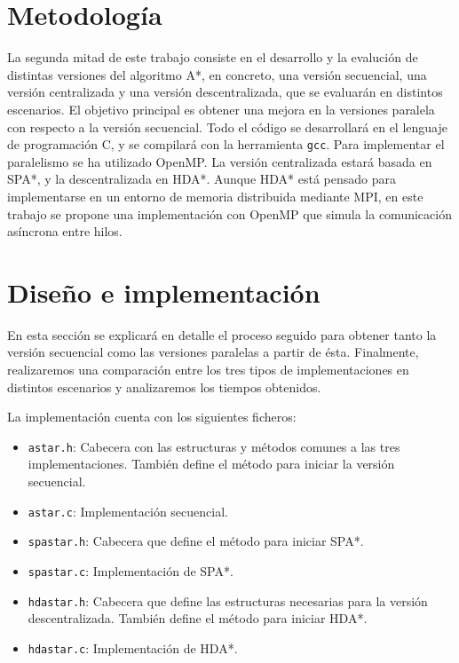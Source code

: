 \documentclass[a4paper,12pt]{article}
\begin{document}
\newpage

\section{Metodología} \label{sec:metodologia}

La segunda mitad de este trabajo consiste en el desarrollo y la evalución de distintas versiones del algoritmo A*, en concreto, una versión secuencial, una versión centralizada y una versión descentralizada, que se evaluarán en distintos escenarios. El objetivo principal es obtener una mejora en la versiones paralela con respecto a la versión secuencial. Todo el código se desarrollará en el lenguaje de programación C, y se compilará con la herramienta \verb|gcc|. Para implementar el paralelismo se ha utilizado OpenMP. La versión centralizada estará basada en SPA*, y la descentralizada en HDA*. Aunque HDA* está pensado para implementarse en un entorno de memoria distribuida mediante MPI, en este trabajo se propone una implementación con OpenMP que simula la comunicación asíncrona entre hilos.


\newpage

\section{Diseño e implementación} \label{sec:implementacion}

En esta sección se explicará en detalle el proceso seguido para obtener tanto la versión secuencial como las versiones paralelas a partir de ésta. Finalmente, realizaremos una comparación entre los tres tipos de implementaciones en distintos escenarios y analizaremos los tiempos obtenidos.

La implementación cuenta con los siguientes ficheros:

\begin{itemize}
    \item \verb|astar.h|: Cabecera con las estructuras y métodos comunes a las tres implementaciones. También define el método para iniciar la versión secuencial.
    \item \verb|astar.c|: Implementación secuencial.
    \item \verb|spastar.h|: Cabecera que define el método para iniciar SPA*.
    \item \verb|spastar.c|: Implementación de SPA*.
    \item \verb|hdastar.h|: Cabecera que define las estructuras necesarias para la versión descentralizada. También define el método para iniciar HDA*.
    \item \verb|hdastar.c|: Implementación de HDA*.
\end{itemize}
\end{document}

